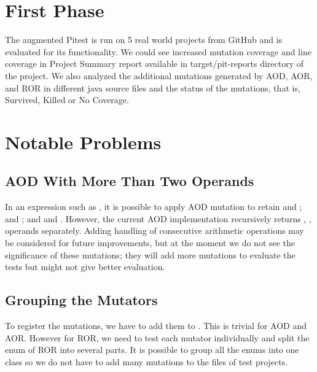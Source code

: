 \section{First Phase}





The augmented Pitest is run on 5 real world projects from GitHub and is evaluated for its functionality.
We could see increased mutation coverage and line coverage in Project Summary report available in target/pit-reports directory of the project.
We also analyzed the additional mutations generated by AOD, AOR, and ROR in different java source files and the status of the mutations, that is, Survived, Killed or No Coverage.

\section{Notable Problems}
\subsection{AOD With More Than Two Operands}
In an expression such as , it is possible to apply AOD mutation to retain  and ;  and ; and  and .
However, the current AOD implementation recursively returns , ,  operands separately.
Adding handling of consecutive arithmetic operations may be considered for future improvements, but at the moment we do not see the significance of these mutations;
they will add more mutations to evaluate the tests but might not give better evaluation.

\subsection{Grouping the Mutators}
To register the mutations, we have to add them to .
This is trivial for AOD and AOR.
However for ROR, we need to test each mutator individually and split the enum of ROR into several parts.
It is possible to group all the enums into one class so we do not have to add many mutations to the  files of test projects.

